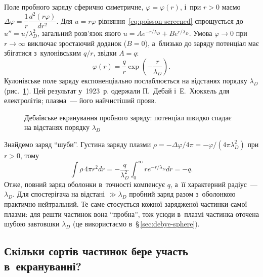 Поле пробного заряду сферично симетричне, $\varphi=\varphi(r)$, і~при $r>0$ маємо
$\Delta\varphi=\dfrac1r\dfrac{d^2(r\varphi)}{dr^2}$. Для $u=r\varphi$
рівняння~\eqref{eq:poisson-screened} спрощується до $u''=u/\lambda_D^2$, загальний
розв'язок якого $u=Ae^{-r/\lambda_D}+Be^{r/\lambda_D}$. Умова $\varphi\to0$ при
$r\to\infty$ виключає зростаючий доданок ($B=0$), а~близько до заряду потенціал має
збігатися з~кулонівським $q/r$, звідки $A=q$:
\begin{equation}\label{eq:screened-potential}
	\varphi(r)=\frac qr\exp\left(-\frac r{\lambda_D}\right).
\end{equation}
Кулонівське поле заряду експоненціально послаблюється на відстанях порядку $\lambda_D$
(рис.~\ref{pic:debye-screening}). Цей результат у~1923~р. одержали П.~Дебай і~Е.~Хюккель
для електролітів; плазма~--- його найчистіший прояв.

\begin{figure}[ht]\centering
	\caption{Дебаївське екранування пробного заряду: потенціал швидко спадає на відстанях
	порядку $\lambda_D$}
	\label{pic:debye-screening}
\end{figure}

Знайдемо заряд \enquote{шуби}. Густина заряду плазми
$\rho=-\Delta\varphi/4\pi=-\varphi/(4\pi\lambda_D^2)$ при $r>0$, тому
\begin{equation*}
	\int\rho\,4\pi r^2dr=-\frac q{\lambda_D^2}\int_0^\infty re^{-r/\lambda_D}dr=-q.
\end{equation*}
Отже, повний заряд оболонки в~точності компенсує $q$, а~її характерний радіус~---
$\lambda_D$. Для спостерігача на відстані $\gg\lambda_D$ пробний заряд разом з~оболонкою
практично нейтральний. Те саме стосується кожної зарядженої частинки самої плазми: для решти частинок вона \enquote{пробна}, тож усюди в~плазмі частинка оточена шубою завтовшки $\lambda_D$ (це використаємо в~§\,\ref{sec:debye-sphere}).


\subsection*{Скільки сортів частинок бере участь в~екрануванні?}


